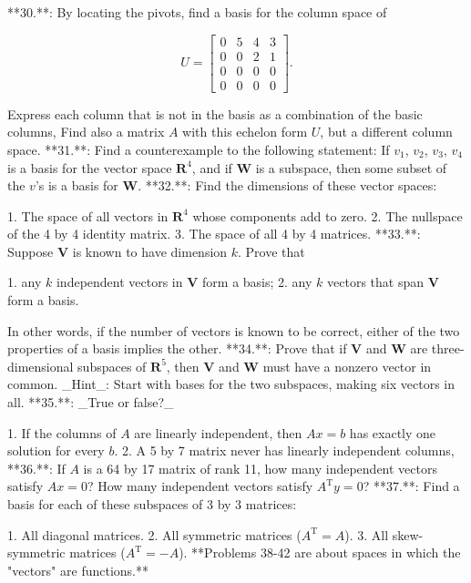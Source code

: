 

**30.**: By locating the pivots, find a basis for the column space of

\[U=\begin{bmatrix}0&5&4&3\\ 0&0&2&1\\ 0&0&0&0\\ 0&0&0&0\end{bmatrix}.\]

Express each column that is not in the basis as a combination of the basic columns, Find also a matrix \(A\) with this echelon form \(U\), but a different column space.
**31.**: Find a counterexample to the following statement: If \(v_{1}\), \(v_{2}\), \(v_{3}\), \(v_{4}\) is a basis for the vector space \(\mathbf{R}^{4}\), and if \(\mathbf{W}\) is a subspace, then some subset of the \(v\)'s is a basis for \(\mathbf{W}\).
**32.**: Find the dimensions of these vector spaces:

1. The space of all vectors in \(\mathbf{R}^{4}\) whose components add to zero.
2. The nullspace of the 4 by 4 identity matrix.
3. The space of all 4 by 4 matrices.
**33.**: Suppose \(\mathbf{V}\) is known to have dimension \(k\). Prove that

1. any \(k\) independent vectors in \(\mathbf{V}\) form a basis;
2. any \(k\) vectors that span \(\mathbf{V}\) form a basis.

In other words, if the number of vectors is known to be correct, either of the two properties of a basis implies the other.
**34.**: Prove that if \(\mathbf{V}\) and \(\mathbf{W}\) are three-dimensional subspaces of \(\mathbf{R}^{5}\), then \(\mathbf{V}\) and \(\mathbf{W}\) must have a nonzero vector in common. _Hint_: Start with bases for the two subspaces, making six vectors in all.
**35.**: _True or false?_

1. If the columns of \(A\) are linearly independent, then \(Ax=b\) has exactly one solution for every \(b\).
2. A 5 by 7 matrix never has linearly independent columns,
**36.**: If \(A\) is a 64 by 17 matrix of rank 11, how many independent vectors satisfy \(Ax=0\)? How many independent vectors satisfy \(A^{\mathrm{T}}y=0\)?
**37.**: Find a basis for each of these subspaces of 3 by 3 matrices:

1. All diagonal matrices.
2. All symmetric matrices (\(A^{\mathrm{T}}=A\)).
3. All skew-symmetric matrices (\(A^{\mathrm{T}}=-A\)).
**Problems 38-42 are about spaces in which the "vectors" are functions.**
